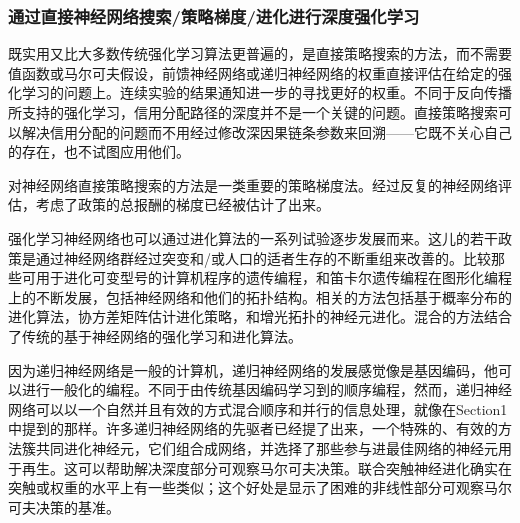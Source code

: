 \documentclass[10pt,journal,compsoc]{IEEEtran}
\begin{document}
\subsubsection{通过直接神经网络搜索/策略梯度/进化进行深度强化学习}
既实用又比大多数传统强化学习算法更普遍的，是直接策略搜索的方法，而不需要值函数或马尔可夫假设，前馈神经网络或递归神经网络的权重直接评估在给定的强化学习的问题上。连续实验的结果通知进一步的寻找更好的权重。不同于反向传播所支持的强化学习，信用分配路径的深度并不是一个关键的问题。直接策略搜索可以解决信用分配的问题而不用经过修改深因果链条参数来回溯——它既不关心自己的存在，也不试图应用他们。\par
对神经网络直接策略搜索的方法是一类重要的策略梯度法。经过反复的神经网络评估，考虑了政策的总报酬的梯度已经被估计了出来。\par
强化学习神经网络也可以通过进化算法的一系列试验逐步发展而来。这儿的若干政策是通过神经网络群经过突变和/或人口的适者生存的不断重组来改善的。比较那些可用于进化可变型号的计算机程序的遗传编程，和笛卡尔遗传编程在图形化编程上的不断发展，包括神经网络和他们的拓扑结构。相关的方法包括基于概率分布的进化算法，协方差矩阵估计进化策略，和增光拓扑的神经元进化。混合的方法结合了传统的基于神经网络的强化学习和进化算法。\par
因为递归神经网络是一般的计算机，递归神经网络的发展感觉像是基因编码，他可以进行一般化的编程。不同于由传统基因编码学习到的顺序编程，然而，递归神经网络可以以一个自然并且有效的方式混合顺序和并行的信息处理，就像在Section1中提到的那样。许多递归神经网络的先驱者已经提了出来，一个特殊的、有效的方法簇共同进化神经元，它们组合成网络，并选择了那些参与进最佳网络的神经元用于再生。这可以帮助解决深度部分可观察马尔可夫决策。联合突触神经进化确实在突触或权重的水平上有一些类似；这个好处是显示了困难的非线性部分可观察马尔可夫决策的基准。\par
\end{document}
